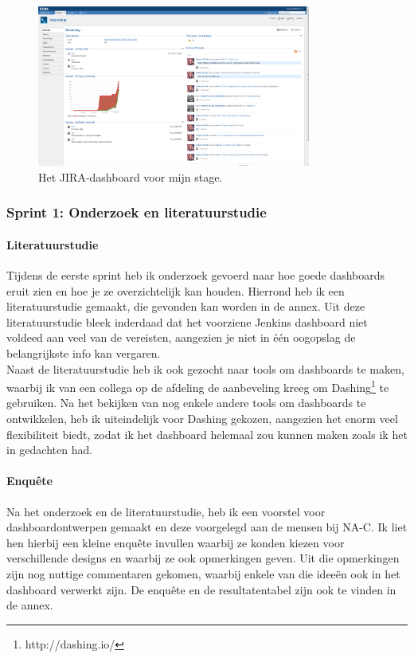 \documentclass[10pt,a4paper]{article}
\begin{document}
\begin{figure}[ht!]
\centering
\includegraphics[width=90mm]{myJIRAscreenshot.png}
\caption{Het JIRA-dashboard voor mijn stage.} 
\label{my_jira}
\end{figure}

\subsubsection{Sprint 1: Onderzoek en literatuurstudie} 
\label{sprint1}
\paragraph{Literatuurstudie} Tijdens de eerste sprint heb ik onderzoek gevoerd naar hoe goede dashboards eruit zien en hoe je ze overzichtelijk kan houden. Hierrond heb ik een literatuurstudie gemaakt, die gevonden kan worden in de annex.   Uit deze literatuurstudie bleek inderdaad dat het voorziene Jenkins dashboard niet voldeed aan veel van de vereisten, aangezien je niet in \'e\'en oogopslag de belangrijkste info kan vergaren.\\
Naast de literatuurstudie heb ik ook gezocht naar tools om dashboards te maken, waarbij ik van een collega op de afdeling de aanbeveling kreeg om Dashing\footnote{http://dashing.io/} te gebruiken. Na het bekijken van nog enkele andere tools om dashboards te ontwikkelen, heb ik uiteindelijk voor Dashing gekozen, aangezien het enorm veel flexibiliteit biedt, zodat ik het dashboard helemaal zou kunnen maken zoals ik het in gedachten had. 
\paragraph{Enqu\^ete}
Na het onderzoek en de literatuurstudie, heb ik een voorstel voor dashboardontwerpen gemaakt en deze voorgelegd aan de mensen bij NA-C. Ik liet hen hierbij een kleine enqu\^ete invullen waarbij ze konden kiezen voor verschillende designs en waarbij ze ook opmerkingen geven. Uit die opmerkingen zijn nog nuttige commentaren gekomen, waarbij enkele van die idee\"en ook in het dashboard verwerkt zijn. De enqu\^ete en de resultatentabel zijn ook te vinden in de annex. 
\end{document}
